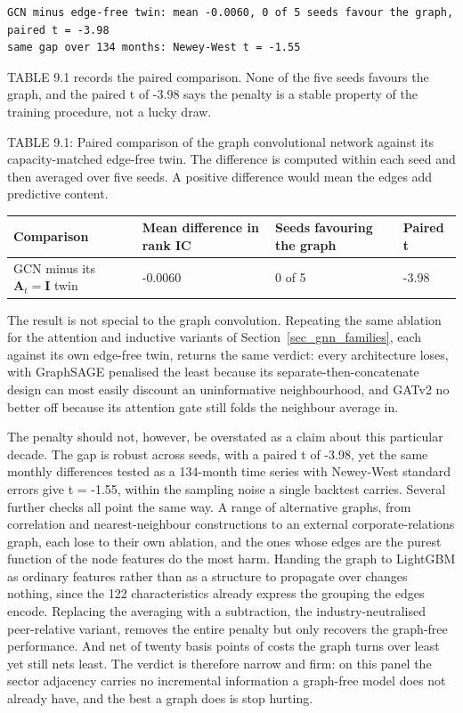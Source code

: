 \begin{verbatim}
GCN minus edge-free twin: mean -0.0060, 0 of 5 seeds favour the graph, paired t = -3.98
same gap over 134 months: Newey-West t = -1.55
\end{verbatim}

TABLE 9.1 records the paired comparison. None of the five seeds favours the graph, and the paired t of -3.98 says the penalty is a stable property of the training procedure, not a lucky draw.

TABLE 9.1: Paired comparison of the graph convolutional network against its capacity-matched edge-free twin. The difference is computed within each seed and then averaged over five seeds. A positive difference would mean the edges add predictive content.

\bigskip\noindent
\begin{tabular}{p{}p{}p{}p{}}
\toprule
Comparison & Mean difference in rank IC & Seeds favouring the graph & Paired t \\
\hline
GCN minus its $\mathbf{A}_t=\mathbf{I}$ twin & -0.0060 & 0 of 5 & -3.98 \\
\bottomrule
\end{tabular}

\bigskip

The result is not special to the graph convolution. Repeating the same ablation for the attention and inductive variants of Section~\ref{sec_gnn_families}, each against its own edge-free twin, returns the same verdict: every architecture loses, with GraphSAGE penalised the least because its separate-then-concatenate design can most easily discount an uninformative neighbourhood, and GATv2 no better off because its attention gate still folds the neighbour average in.

The penalty should not, however, be overstated as a claim about this particular decade. The gap is robust across seeds, with a paired t of -3.98, yet the same monthly differences tested as a 134-month time series with Newey-West standard errors give t = -1.55, within the sampling noise a single backtest carries. Several further checks all point the same way. A range of alternative graphs, from correlation and nearest-neighbour constructions to an external corporate-relations graph, each lose to their own ablation, and the ones whose edges are the purest function of the node features do the most harm. Handing the graph to LightGBM as ordinary features rather than as a structure to propagate over changes nothing, since the 122 characteristics already express the grouping the edges encode. Replacing the averaging with a subtraction, the industry-neutralised peer-relative variant, removes the entire penalty but only recovers the graph-free performance. And net of twenty basis points of costs the graph turns over least yet still nets least. The verdict is therefore narrow and firm: on this panel the sector adjacency carries no incremental information a graph-free model does not already have, and the best a graph does is stop hurting.

